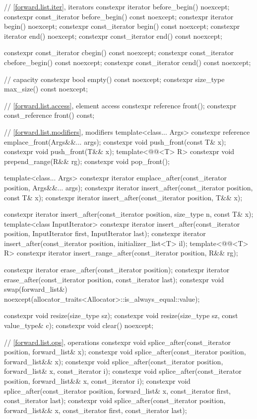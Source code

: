 \begin{codeblock}
{{    // \ref{forward.list.iter}, iterators
    constexpr iterator before_begin() noexcept;
    constexpr const_iterator before_begin() const noexcept;
    constexpr iterator begin() noexcept;
    constexpr const_iterator begin() const noexcept;
    constexpr iterator end() noexcept;
    constexpr const_iterator end() const noexcept;

    constexpr const_iterator cbegin() const noexcept;
    constexpr const_iterator cbefore_begin() const noexcept;
    constexpr const_iterator cend() const noexcept;

    // capacity
    constexpr bool empty() const noexcept;
    constexpr size_type max_size() const noexcept;

    // \ref{forward.list.access}, element access
    constexpr reference front();
    constexpr const_reference front() const;

    // \ref{forward.list.modifiers}, modifiers
    template<class... Args> constexpr reference emplace_front(Args&&... args);
    constexpr void push_front(const T& x);
    constexpr void push_front(T&& x);
    template<@@<T> R>
      constexpr void prepend_range(R&& rg);
    constexpr void pop_front();

    template<class... Args>
      constexpr iterator emplace_after(const_iterator position, Args&&... args);
    constexpr iterator insert_after(const_iterator position, const T& x);
    constexpr iterator insert_after(const_iterator position, T&& x);

    constexpr iterator insert_after(const_iterator position, size_type n, const T& x);
    template<class InputIterator>
      constexpr iterator insert_after(const_iterator position,
                                      InputIterator first, InputIterator last);
    constexpr iterator insert_after(const_iterator position, initializer_list<T> il);
    template<@@<T> R>
      constexpr iterator insert_range_after(const_iterator position, R&& rg);

    constexpr iterator erase_after(const_iterator position);
    constexpr iterator erase_after(const_iterator position, const_iterator last);
    constexpr void swap(forward_list&)
      noexcept(allocator_traits<Allocator>::is_always_equal::value);

    constexpr void resize(size_type sz);
    constexpr void resize(size_type sz, const value_type& c);
    constexpr void clear() noexcept;

    // \ref{forward.list.ops},  operations
    constexpr void splice_after(const_iterator position, forward_list& x);
    constexpr void splice_after(const_iterator position, forward_list&& x);
    constexpr void splice_after(const_iterator position, forward_list& x, const_iterator i);
    constexpr void splice_after(const_iterator position, forward_list&& x, const_iterator i);
    constexpr void splice_after(const_iterator position, forward_list& x,
                      const_iterator first, const_iterator last);
    constexpr void splice_after(const_iterator position, forward_list&& x,
                      const_iterator first, const_iterator last);

}}
\end{codeblock}
